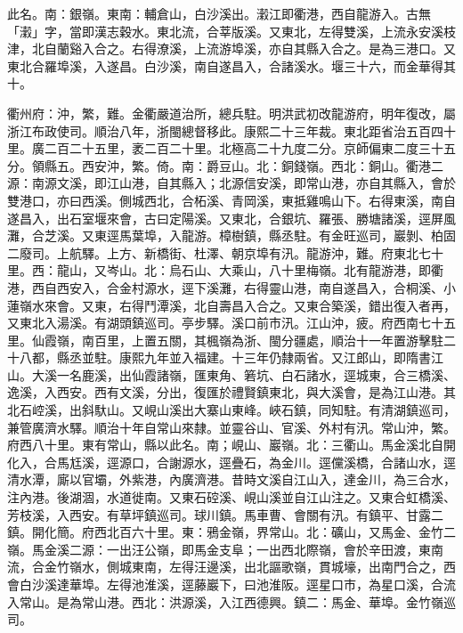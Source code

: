 \begin{pinyinscope}
此名。南：銀嶺。東南：輔倉山，白沙溪出。瀔江即衢港，西自龍游入。古無「瀔」字，當即漢志穀水。東北流，合莘版溪。又東北，左得雙溪，上流永安溪枝津，北自蘭谿入合之。右得潦溪，上流游埠溪，亦自其縣入合之。是為三港口。又東北合羅埠溪，入遂昌。白沙溪，南自遂昌入，合諸溪水。堰三十六，而金華得其十。

衢州府：沖，繁，難。金衢嚴道治所，總兵駐。明洪武初改龍游府，明年復改，屬浙江布政使司。順治八年，浙閩總督移此。康熙二十三年裁。東北距省治五百四十里。廣二百二十五里，袤二百二十里。北極高二十九度二分。京師偏東二度三十五分。領縣五。西安沖，繁。倚。南：爵豆山。北：銅錢嶺。西北：銅山。衢港二源：南源文溪，即江山港，自其縣入；北源信安溪，即常山港，亦自其縣入，會於雙港口，亦曰西溪。側城西北，合柘溪、青岡溪，東抵雞鳴山下。右得東溪，南自遂昌入，出石室堰來會，古曰定陽溪。又東北，合銀坑、羅張、勝塘諸溪，逕屏風灘，合芝溪。又東逕馬葉埠，入龍游。樟樹鎮，縣丞駐。有金旺巡司，巖剝、柏固二廢司。上航驛。上方、新橋街、杜澤、朝京埠有汛。龍游沖，難。府東北七十里。西：龍山，又岑山。北：烏石山、大乘山，八十里梅嶺。北有龍游港，即衢港，西自西安入，合金村源水，逕下溪灘，右得靈山港，南自遂昌入，合桐溪、小蓮嶺水來會。又東，右得鬥潭溪，北自壽昌入合之。又東合築溪，錯出復入者再，又東北入湯溪。有湖頭鎮巡司。亭步驛。溪口前巿汛。江山沖，疲。府西南七十五里。仙霞嶺，南百里，上置五關，其楓嶺為浙、閩分疆處，順治十一年置游擊駐二十八都，縣丞並駐。康熙九年並入福建。十三年仍隸兩省。又江郎山，即隋書江山。大溪一名鹿溪，出仙霞諸嶺，匯東角、箬坑、白石諸水，逕城東，合三橋溪、逸溪，入西安。西有文溪，分出，復匯於禮賢鎮東北，與大溪會，是為江山港。其北石崆溪，出斜馱山。又峴山溪出大寨山東峰。峽石鎮，同知駐。有清湖鎮巡司，兼管廣濟水驛。順治十年自常山來隸。並靈谷山、官溪、外村有汛。常山沖，繁。府西八十里。東有常山，縣以此名。南；峴山、巖嶺。北：三衢山。馬金溪北自開化入，合馬尪溪，逕源口，合謝源水，逕疊石，為金川。逕儻溪橋，合諸山水，逕清水潭，廝以官壩，外紫港，內廣濟港。昔時文溪自江山入，達金川，為三合水，注內港。後湖涸，水道徙南。又東石硿溪、峴山溪並自江山注之。又東合虹橋溪、芳枝溪，入西安。有草坪鎮巡司。球川鎮。馬車曹、會關有汛。有鎮平、甘露二鎮。開化簡。府西北百六十里。東：鴉金嶺，界常山。北：礦山，又馬金、金竹二嶺。馬金溪二源：一出汪公嶺，即馬金支阜；一出西北際嶺，會於辛田渡，東南流，合金竹嶺水，側城東南，左得汪邊溪，出北謳歌嶺，貫城壕，出南門合之，西會白沙溪達華埠。左得池淮溪，逕藤巖下，曰池淮阪。逕星口巿，為星口溪，合流入常山。是為常山港。西北：洪源溪，入江西德興。鎮二：馬金、華埠。金竹嶺巡司。


\end{pinyinscope}
